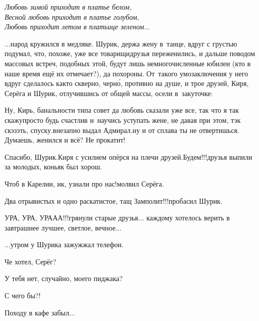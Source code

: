 {\vspace{0.1cm}
\noindent\textit{%
	\hspace*{1.4cm}Любовь зимой приходит в платье белом,\\
	\hspace*{1.4cm}Весной любовь приходит в платье голубом,\\
	\hspace*{1.4cm}Любовь приходит летом в платьице зеленом$\ldots$
}

$\ldots$народ кружился в медляке. Шурик, держа жену в~танце, вдруг с грустью подумал, что, похоже, уже все товарищи\sdash друзья переженились, и дальше поводом массовых встреч, подобных этой, будут лишь немногочисленные юбилеи (кто в наше время ещё их отмечает?), да похороны. От~такого умозаключения у него вдруг сделалось как\sdash то скверно, черн\'{о}, противно на душе, и трое друзей, Киря, Серёга и Шурик, отлучившись от общей массы, осели в~закуточке:

\diagdash Ну, Кирь, банальности типа совет да любовь сказали уже все, так что я так скажу\mdash просто будь счастлив и~научись уступать жене, не давая при этом, тэк скэзэть, спуску.\mdash внезапно выдал Адмирал.\mdash ну и от сплава ты не отвертишься. Думаешь, женился и всё? Не прокатит!

\diagdash Спасибо, Шурик.\mdash Киря с усилием опёрся на плечи друзей.\mdash Будем!!!\mdash друзья выпили за молодых, коньяк был хорош.

\diagdash Чтоб в Карелии, ик, узнали про нас!\mdash молвил Серёга.

\diagdash Два отрывистых и одно раскатистое, тащ Замполит!!!\mdash пробасил Шурик.

\diagdash УРА, УРА, УРА\sdash А\sdash А!!!\mdash грянули старые друзья$\ldots$ каждому хотелось верить в завтрашнее лучшее, светлое, вечное$\ldots$

\vspace{1.5cm}

$\ldots$утром у Шурика зажужжал телефон. 

\diagdash Че хотел, Серёг?

\diagdash У тебя нет, случайно, моего пиджака?

\diagdash С чего бы?!

\diagdash Походу в кафе забыл$\ldots$

\begin{center}
\end{center}
}